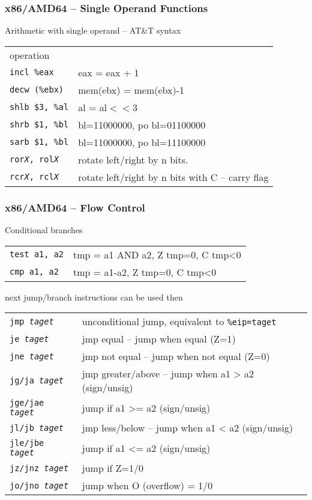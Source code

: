 \documentclass{beamer}
\begin{document}
\begin{frame}
\frametitle{x86/AMD64 -- Single Operand Functions}
Arithmetic with single operand -- AT\&T syntax
\begin{tabular}{ l l}
operation &\\
\texttt{incl            \%eax} &              eax = eax + 1\\
\texttt{decw            (\%ebx)} &                 mem(ebx) = mem(ebx)-1\\
\texttt{shlb            \$3, \%al} &                al = al$<<$3\\
\texttt{shrb            \$1, \%bl} &                bl=11000000, po bl=01100000\\
\texttt{sarb            \$1, \%bl} &                bl=11000000, po bl=11100000\\
\texttt{ror\textit{X}, rol\textit{X}} & rotate left/right by n bits.  \\
\texttt{rcr\textit{X}, rcl\textit{X}} & rotate left/right by n bits with C -- carry flag\\
\end{tabular}
\end{frame}


\begin{frame}
\frametitle{x86/AMD64 -- Flow Control}
Conditional branches\\
\begin{tabular}{ l l}
\texttt{test    a1, a2} &  tmp = a1 AND a2, Z tmp=0, C tmp<0\\
\texttt{cmp     a1, a2} &  tmp = a1-a2, Z tmp=0, C tmp<0\\
\end{tabular}

next jump/branch instructions can be used then
\begin{tabular}{ l l}
\texttt{jmp \textit{taget}} & unconditional jump, equivalent to \texttt{\%eip=taget}\\
\texttt{je  \textit{taget}} & jmp equal -- jump when equal (Z=1)\\
\texttt{jne \textit{taget}} & jmp not equal -- jump when not equal (Z=0)\\
\texttt{jg/ja \textit{taget}} & jmp greater/above -- jump when a1 > a2 (sign/unsig)\\
\texttt{jge/jae \textit{taget}} & jump if a1 >= a2 (sign/unsig)\\
\texttt{jl/jb \textit{taget}} & jmp less/below -- jump when a1 < a2 (sign/unsig)\\
\texttt{jle/jbe \textit{taget}} & jump if a1 <= a2 (sign/unsig)\\
\texttt{jz/jnz \textit{taget}} & jump if Z=1/0\\
\texttt{jo/jno \textit{taget}}& jump when O (overflow) = 1/0\\
\end{tabular}
\end{frame}
\end{document}
